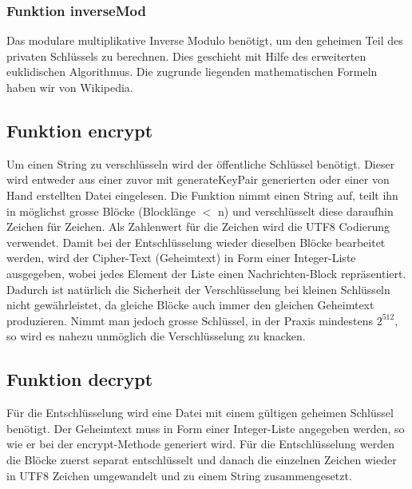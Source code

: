 \documentclass[a4paper, 11pt]{article} %
\begin{document}
\subsubsection{Funktion inverseMod}
Das modulare multiplikative Inverse Modulo benötigt, um den geheimen Teil des privaten Schlüssels zu berechnen. Dies geschieht mit Hilfe des erweiterten euklidischen Algorithmus. Die zugrunde liegenden mathematischen Formeln haben wir von Wikipedia.


\subsection{Funktion encrypt}
Um einen String zu verschlüsseln wird der öffentliche Schlüssel benötigt. Dieser wird entweder aus einer zuvor mit generateKeyPair generierten oder einer von Hand erstellten Datei eingelesen.
Die Funktion nimmt einen String auf, teilt ihn in möglichst grosse Blöcke (Blocklänge $<$ n) und verschlüsselt diese daraufhin Zeichen für Zeichen. Als Zahlenwert für die Zeichen wird die UTF8 Codierung verwendet.
Damit bei der Entschlüsselung wieder dieselben Blöcke bearbeitet werden, wird der Cipher-Text (Geheimtext) in Form einer Integer-Liste ausgegeben, wobei jedes Element der Liste einen Nachrichten-Block repräsentiert.
Dadurch ist natürlich die Sicherheit der Verschlüsselung bei kleinen Schlüsseln nicht gewährleistet, da gleiche Blöcke auch immer den gleichen Geheimtext produzieren. Nimmt man jedoch grosse Schlüssel, in der Praxis mindestens $2^{512}$, so wird es nahezu unmöglich die Verschlüsselung zu knacken.





\subsection{Funktion decrypt}
Für die Entschlüsselung wird eine Datei mit einem gültigen geheimen Schlüssel benötigt. Der Geheimtext muss in Form einer Integer-Liste angegeben werden, so wie er bei der encrypt-Methode generiert wird.
Für die Entschlüsselung werden die Blöcke zuerst separat entschlüsselt und danach die einzelnen Zeichen wieder in UTF8 Zeichen umgewandelt und zu einem String zusammengesetzt.


\end{document}
